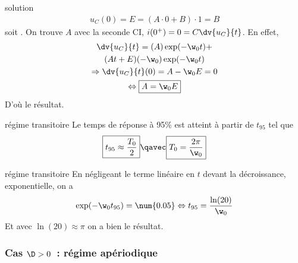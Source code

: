 \documentclass[../main/main.tex]{subfiles}
\begin{document}
\begin{tcbraster}[raster columns=2, raster equal height=rows]
\begin{demo}[label=demo:solupseudoper]{solution}
\begin{gather*}
            u_C(0) = E = (A\cdot0 + B)\cdot1 = B
        \end{gather*}
        soit .
        On trouve $A$ avec la seconde CI, $i(0^+) = 0 = C\dv{u_C}{t}$. En effet,
        \begin{gather*}
            \dv{u_C}{t} = (A)\exp(-\w_0t) +\\
            (At+E)(-\w_0)\exp(-\w_0t)\\
            \Rightarrow \dv{u_C}{t} (0) = A -\w_0E = 0\\
            \Leftrightarrow \boxed{A = \w_0E}
        \end{gather*}
        D'où le résultat.
    \end{demo}
    \begin{prop}[label=prop:transicrit]{régime transitoire}
        Le temps de réponse à 95\% est atteint à partir de $t_{95}$ tel que
        \begin{equation*}
            \boxed{t_{95} \approx \frac{T_0}{2}} \qavec \boxed{T_0 = \frac{2\pi}{\w_0}}
        \end{equation*}
    \end{prop}
    \begin{demo}[label=demo:transicrit]{régime transitoire}
        En négligeant le terme linéaire en $t$ devant la décroissance,
        exponentielle, on a
        \begin{gather*}
            \exp (-\w_0t_{95}) = \num{0.05} \Leftrightarrow t_{95} =
            \frac{\ln(20)}{\w_0}
        \end{gather*}
        Et avec $\ln(20) \approx \pi$ on a bien le résultat.
    \end{demo}
\end{tcbraster}

\subsubsection{Cas $\D > 0$~: régime apériodique}
\end{document}
